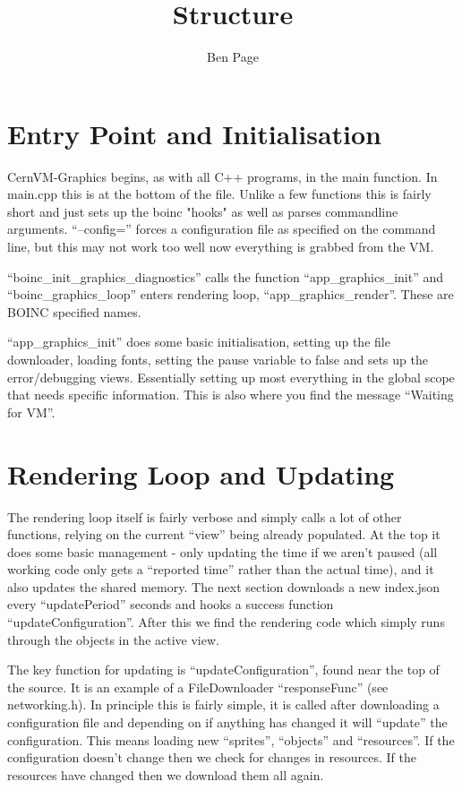 \documentclass[a4paper]{article}
\title{\cernvmgraphics{} Structure}
\author{Ben Page}
\newcommand{\cernvmgraphics}{CernVM-Graphics}
\newcommand{\boinc}{BOINC}
\begin{document}
\maketitle

\section{Entry Point and Initialisation}
  \cernvmgraphics{} begins, as with all C++ programs, in the main function.
  In main.cpp this is at the bottom of the file. Unlike a few functions this
  is fairly short and just sets up the boinc "hooks" as well as parses
  commandline arguments. ``--config='' forces a configuration file as
  specified on the command line, but this may not work too well now
  everything is grabbed from the VM. 
  
  ``boinc\_init\_graphics\_diagnostics'' calls the function 
  ``app\_graphics\_init'' and ``boinc\_graphics\_loop'' enters rendering 
  loop, ``app\_graphics\_render''. These are \boinc{} specified names.

  ``app\_graphics\_init'' does some basic initialisation, setting up the
  file downloader, loading fonts, setting the pause variable to false and
  sets up the error/debugging views. Essentially setting up most everything
  in the global scope that needs specific information. This is also where
  you find the message ``Waiting for VM''.

\section{Rendering Loop and Updating}
  The rendering loop itself is fairly verbose and simply calls a lot of
  other functions, relying on the current ``view'' being already populated.
  At the top it does some basic management - only updating the time if we
  aren't paused (all working code only gets a ``reported time'' rather than
  the actual time), and it also updates the shared memory. The next section
  downloads a new index.json every ``updatePeriod'' seconds and hooks a
  success function ``updateConfiguration''. After this we find the rendering
  code which simply runs through the objects in the active view. 

  The key function for updating is ``updateConfiguration'', found near the
  top of the source. It is an example of a FileDownloader ``responseFunc''
  (see networking.h). In principle this is fairly simple, it is called
  after downloading a configuration file and depending on if anything has
  changed it will ``update'' the configuration. This means loading new
  ``sprites'', ``objects'' and ``resources''. If the configuration doesn't
  change then we check for changes in resources. If the resources have
  changed then we download them all again.
\end{document}
